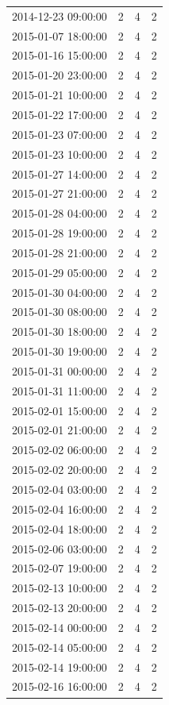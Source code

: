 \begin{tabular}{lrrr}
2014-12-23 09:00:00 & 2 & 4 & 2 \\
2015-01-07 18:00:00 & 2 & 4 & 2 \\
2015-01-16 15:00:00 & 2 & 4 & 2 \\
2015-01-20 23:00:00 & 2 & 4 & 2 \\
2015-01-21 10:00:00 & 2 & 4 & 2 \\
2015-01-22 17:00:00 & 2 & 4 & 2 \\
2015-01-23 07:00:00 & 2 & 4 & 2 \\
2015-01-23 10:00:00 & 2 & 4 & 2 \\
2015-01-27 14:00:00 & 2 & 4 & 2 \\
2015-01-27 21:00:00 & 2 & 4 & 2 \\
2015-01-28 04:00:00 & 2 & 4 & 2 \\
2015-01-28 19:00:00 & 2 & 4 & 2 \\
2015-01-28 21:00:00 & 2 & 4 & 2 \\
2015-01-29 05:00:00 & 2 & 4 & 2 \\
2015-01-30 04:00:00 & 2 & 4 & 2 \\
2015-01-30 08:00:00 & 2 & 4 & 2 \\
2015-01-30 18:00:00 & 2 & 4 & 2 \\
2015-01-30 19:00:00 & 2 & 4 & 2 \\
2015-01-31 00:00:00 & 2 & 4 & 2 \\
2015-01-31 11:00:00 & 2 & 4 & 2 \\
2015-02-01 15:00:00 & 2 & 4 & 2 \\
2015-02-01 21:00:00 & 2 & 4 & 2 \\
2015-02-02 06:00:00 & 2 & 4 & 2 \\
2015-02-02 20:00:00 & 2 & 4 & 2 \\
2015-02-04 03:00:00 & 2 & 4 & 2 \\
2015-02-04 16:00:00 & 2 & 4 & 2 \\
2015-02-04 18:00:00 & 2 & 4 & 2 \\
2015-02-06 03:00:00 & 2 & 4 & 2 \\
2015-02-07 19:00:00 & 2 & 4 & 2 \\
2015-02-13 10:00:00 & 2 & 4 & 2 \\
2015-02-13 20:00:00 & 2 & 4 & 2 \\
2015-02-14 00:00:00 & 2 & 4 & 2 \\
2015-02-14 05:00:00 & 2 & 4 & 2 \\
2015-02-14 19:00:00 & 2 & 4 & 2 \\
2015-02-16 16:00:00 & 2 & 4 & 2 \\

\end{tabular}
